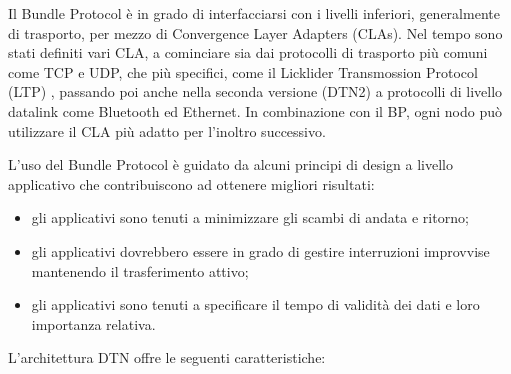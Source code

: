 \documentclass[12pt,a4paper,oneside]{book}
\begin{document}
		Il Bundle Protocol è in grado di interfacciarsi con i livelli inferiori, generalmente di trasporto, per mezzo di Convergence Layer Adapters (CLAs). Nel tempo sono stati definiti vari CLA, a cominciare sia dai protocolli di trasporto più comuni come TCP e UDP, che più specifici, come il Licklider Transmossion Protocol (LTP) \cite{ramadas2008rfc}, passando poi anche nella seconda versione (DTN2) a protocolli di livello datalink come Bluetooth ed Ethernet. 
		In combinazione con il BP, ogni nodo può utilizzare il CLA più adatto per l'inoltro successivo. 
		
		L'uso del Bundle Protocol è guidato da alcuni principi di design a livello applicativo che contribuiscono ad ottenere migliori risultati:
		\begin{itemize}
			\item gli applicativi sono tenuti a minimizzare gli scambi di andata e ritorno;
			\item gli applicativi dovrebbero essere in grado di gestire interruzioni improvvise mantenendo il trasferimento attivo;
			\item gli applicativi sono tenuti a specificare il tempo di validità dei dati e loro importanza relativa.
		\end{itemize}	
		L'architettura DTN offre le seguenti caratteristiche:
		
\end{document}
